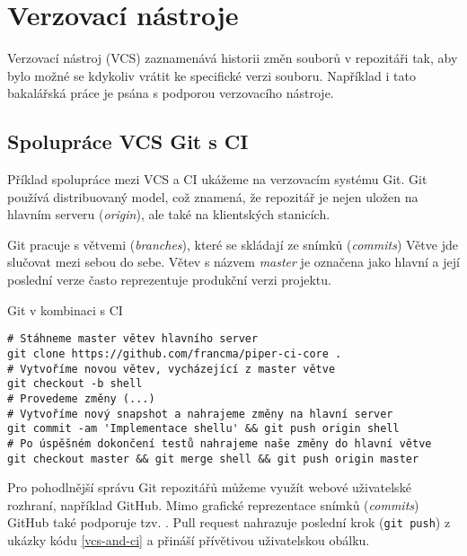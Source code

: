\section{Verzovací nástroje}

Verzovací nástroj (VCS) zaznamenává historii změn souborů v repozitáři tak, aby bylo možné se kdykoliv vrátit ke specifické verzi souboru.
Například i tato bakalářská práce je psána s podporou verzovacího nástroje.

\subsection{Spolupráce VCS Git s CI}

Příklad spolupráce mezi VCS a CI ukážeme na verzovacím systému Git.
Git používá distribuovaný model, což znamená, že repozitář je nejen uložen na hlavním serveru (\textit{origin}), ale také na klientských stanicích.

Git pracuje s větvemi (\textit{branches}), které se skládají ze snímků (\textit{commits})
Větve jde slučovat mezi sebou do sebe.
Větev s názvem \textit{master} je označena jako hlavní a její poslední verze často reprezentuje produkční verzi projektu.


\begin{listing}[ht]
\caption{\label{vcs-and-ci}Git v kombinaci s CI}
\begin{verbatim}
# Stáhneme master větev hlavního server 
git clone https://github.com/francma/piper-ci-core .
# Vytvoříme novou větev, vycházející z master větve
git checkout -b shell
# Provedeme změny (...)
# Vytvoříme nový snapshot a nahrajeme změny na hlavní server
git commit -am 'Implementace shellu' && git push origin shell
# Po úspěšném dokončení testů nahrajeme naše změny do hlavní větve
git checkout master && git merge shell && git push origin master
\end{verbatim}
\end{listing}

Pro pohodlnější správu Git repozitářů můžeme využít webové uživatelské rozhraní, například GitHub.
Mimo grafické reprezentace snímků (\textit{commits}) GitHub také podporuje tzv. . 
Pull request nahrazuje poslední krok (\verb|git push|) z ukázky kódu \ref{vcs-and-ci} a přináší přívětivou uživatelskou obálku.

